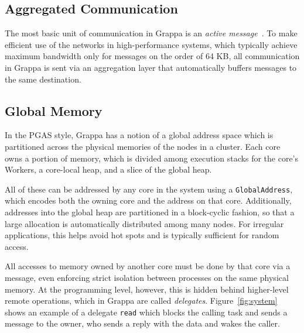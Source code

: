 \subsection{Aggregated Communication}
The most basic unit of communication in Grappa is an \emph{active message}~\cite{vonEicken92}.
To make efficient use of the networks in high-performance systems, which typically achieve maximum bandwidth only for messages on the order of 64 KB, all communication in Grappa is sent via an aggregation layer that automatically buffers messages to the same destination.

\subsection{Global Memory}
In the PGAS style, Grappa has a notion of a global address space which is partitioned across the physical memories of the nodes in a cluster. Each core owns a portion of memory, which is divided among execution stacks for the core's Workers, a core-local heap, and a slice of the global heap.

All of these can be addressed by any core in the system using a \texttt{GlobalAddress}, which encodes both the owning core and the address on that core. Additionally, addresses into the global heap are partitioned in a block-cyclic fashion, so that a large allocation is automatically distributed among many nodes. For irregular applications, this helps avoid hot spots and is typically sufficient for random access.

All accesses to memory owned by another core must be done by that core via a message, even enforcing strict isolation between processes on the same physical memory. At the programming level, however, this is hidden behind higher-level remote operations, which in Grappa are called \emph{delegates}. Figure~\ref{fig:system} shows an example of a delegate \texttt{read} which blocks the calling task and sends a message to the owner, who sends a reply with the data and wakes the caller.

